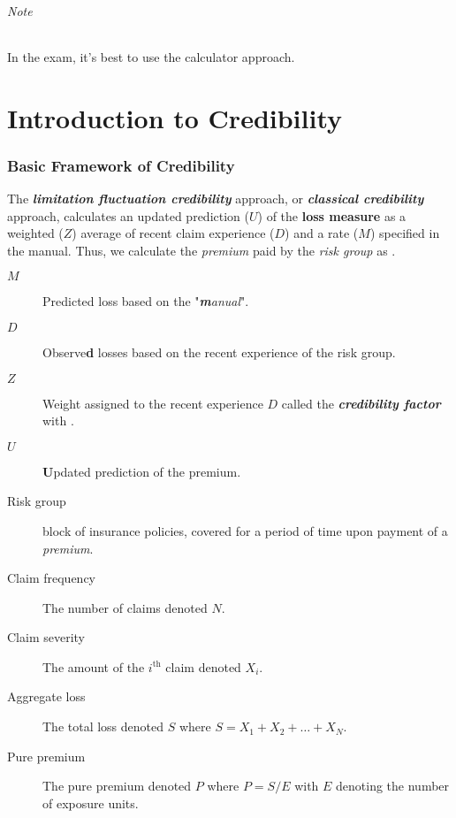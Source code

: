 \documentclass[english]{article}
\begin{document}
\begin{multicols*}{2}
\begin{definitionNOHFILL}[Mode]
\paragraph{Note}	In the exam, it's best to use the calculator approach.
\end{definitionNOHFILL}


\newpage
\part{Introduction to Credibility}\label{part:cred}
\section{Basic Framework of Credibility}\label{sec:A1credBasics}
\begin{rappel_enhanced}[Context]
The \textbf{\textit{limitation fluctuation credibility}} approach, or \textbf{\textit{classical credibility}} approach, calculates an updated prediction ($U$) of the \textbf{loss measure} as a weighted ($Z$) average of recent claim experience ($D$) and a rate ($M$) specified in the manual. Thus, we calculate the \textit{premium} paid by the \textit{risk group} as .
\end{rappel_enhanced}

\begin{distributions}[Notation]
\begin{description}
	\item[$M$]	Predicted loss based on the "\textit{\textbf{m}anual}".
	\item[$D$]	Observe\textbf{d} losses based on the recent experience of the risk group.
	\item[$Z$]	Weight assigned to the recent experience $D$ called the \textbf{\textit{credibility factor}} with . 
	\item[$U$]	\textbf{U}pdated prediction of the premium.
\end{description}
\end{distributions}

\begin{distributions}[Terminology]
\begin{description}
	\item[Risk group]	block of insurance policies, covered for a period of time upon payment of a \textit{premium}.
	\item[Claim frequency]	The number of claims denoted $N$.
	\item[Claim severity]	The amount of the $i^{\text{th}}$ claim denoted $X_{i}$.
	\item[Aggregate loss]	The total loss denoted $S$ where $S = X_{1} + X_{2} + \hdots + X_{N}$.
	\item[Pure premium]	The pure premium denoted $P$ where $P = S/E$ with $E$ denoting the number of exposure units.
\end{description}
\end{distributions}


\end{multicols*}
\end{document}
